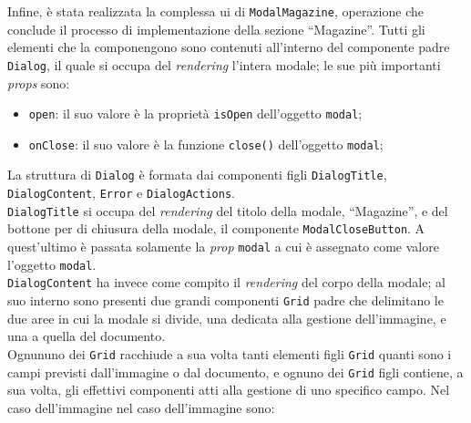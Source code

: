 
Infine, è stata realizzata la complessa \acrshort{ui} di \texttt{ModalMagazine}, operazione che conclude il processo di implementazione della sezione “Magazine”. Tutti gli elementi che la componengono sono contenuti all'interno del componente padre \texttt{Dialog}, il quale si occupa del \textit{rendering} l'intera modale; le sue più importanti \textit{props} sono:
\begin{itemize}
    \item \texttt{open}: il suo valore è la proprietà \texttt{isOpen} dell'oggetto \texttt{modal};
    
    \item \texttt{onClose}: il suo valore è la funzione \texttt{close()} dell'oggetto \texttt{{modal}};
\end{itemize}
La struttura di \texttt{Dialog} è formata dai componenti figli \texttt{DialogTitle}, \texttt{DialogContent}, \texttt{Error} e \texttt{DialogActions}.\\
\texttt{DialogTitle} si occupa del \textit{rendering} del titolo della modale, “Magazine”, e del bottone per di chiusura della modale, il componente \texttt{ModalCloseButton}. A quest'ultimo è passata solamente la \textit{prop} \texttt{modal} a cui è assegnato come valore l'oggetto \texttt{modal}.\\
\texttt{DialogContent} ha invece come compito il \textit{rendering} del corpo della modale; al suo interno sono presenti due grandi componenti \texttt{Grid} padre che delimitano le due aree in cui la modale si divide, una dedicata alla gestione dell'immagine, e una a quella del documento.\\
Ognununo dei \texttt{Grid} racchiude a sua volta tanti elementi figli \texttt{Grid} quanti sono i campi previsti dall'immagine o dal documento, e ognuno dei \texttt{Grid} figli contiene, a sua volta, gli effettivi componenti atti alla gestione di uno specifico campo. Nel caso dell'immagine nel caso dell'immagine sono:
